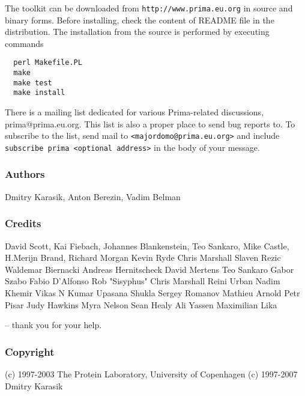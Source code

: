 \documentclass{report}
\begin{document}
The toolkit can be downloaded from \texttt{http://www.prima.eu.org} in
source and binary forms. Before installing, check the content of README file
in the distribution. The installation from the source is performed by
executing commands
\begin{verbatim}
  perl Makefile.PL
  make
  make test
  make install
\end{verbatim}

There is a mailing list dedicated for various Prima-related discussions,
prima@prima.eu.org. This list is also a proper place to send bug reports to.
To subscribe to the list, send mail to \texttt{<majordomo@prima.eu.org>} and
include \texttt{subscribe prima <optional address>} in the body of your message.

\subsubsection{Authors}

Dmitry Karasik,
Anton Berezin,
Vadim Belman

\subsubsection{Credits}

David Scott,
Kai Fiebach,
Johannes Blankenstein,
Teo Sankaro,
Mike Castle,
H.Merijn Brand,
Richard Morgan
Kevin Ryde
Chris Marshall
Slaven Rezic
Waldemar Biernacki
Andreas Hernitscheck
David Mertens
Teo Sankaro
Gabor Szabo
Fabio D'Alfonso
Rob "Sisyphus"
Chris Marshall
Reini Urban
Nadim Khemir
Vikas N Kumar
Upasana Shukla
Sergey Romanov
Mathieu Arnold
Petr Pisar
Judy Hawkins
Myra Nelson
Sean Healy
Ali Yassen
Maximilian Lika

-- thank you for your help.

\subsubsection{Copyright}

(c) 1997-2003 The Protein Laboratory, University of Copenhagen
(c) 1997-2007 Dmitry Karasik
\end{document}
